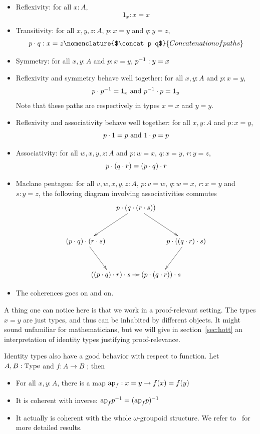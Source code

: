 \begin{itemize}
\item Reflexivity: for all $x:A$, \[1_x:x=x\]
\item Transitivity: for all $x,y,z:A$, $p:x=y$ and $q:y= z$, \[\concat p
 q: x = z\nomenclature{$\concat p q$}{Concatenation of paths}\]
\item Symmetry: for all $x,y:A$ and $p:x=y$, $p^{-1}:
  y=x$
\item Reflexivity and symmetry behave well together: for all $x,y:A$
  and $p:x=y$, \[p\cdot p^{-1} = 1_x\text{ and } p^{-1}\cdot p = 1_y\]
  Note that these paths are respectively in types $x=x$ and $y=y$.
\item Reflexivity and associativity behave well together: for all
  $x,y:A$ and $p:x=y$, 
  \[p\cdot 1 = p \text{ and } 1\cdot p = p\]
\item Associativity: for all $w,x,y,z:A$ and $p:w=x$, $q:x=y$,
  $r:y=z$,
  \[p\cdot (q\cdot r) = (p\cdot q)\cdot r\]
\item Maclane pentagon: for all $v,w,x,y,z:A$, $p:v=w$, $q:w=x$, $r:x=y$ and
  $s:y=z$, the following diagram involving associativities commutes
\[
  \xymatrix @!0 @R=4pc @C=3pc {
    && \concat p {(\concat q {(\concat r s)})} \ar[dll] \ar[drr]&& \\
    \concat {(\concat p q)} {(\concat r s)}\ar[dr] &&&& \concat p {(\concat
      {(\concat q r)} s)}\ar[ld] \\
    & \concat {(\concat {(\concat p q)} r)} \ar[rr] s && \concat {(\concat p
      {(\concat q r)})} s &
  }
\]
\item The coherences goes on and on.
\end{itemize}

A thing one can notice here is that we work in a proof-relevant
setting. The types $x=y$ are just types, and thus can be inhabited by
different objects. It might sound unfamiliar for mathematicians, but
we will give in section~\ref{sec:hott} an interpretation of identity
types justifying proof-relevance.

Identity types also have a good behavior with respect to function. Let
$A,B:\operatorname{Type}$ and $f:A \to B$ ; then
\begin{itemize}
\item For all $x,y:A$, there is a map $\mathrm{ap}_{f}: x = y \to f(x) = f(y)$
\item It is coherent with inverse: $\mathrm{ap}_{f} p^{-1} = (\mathrm{ap}_{f} p)^{-1}$
\item It actually is coherent with the whole $\omega$-groupoid
  structure. We refer to~\cite{hottbook} for more detailed results.
\end{itemize}



